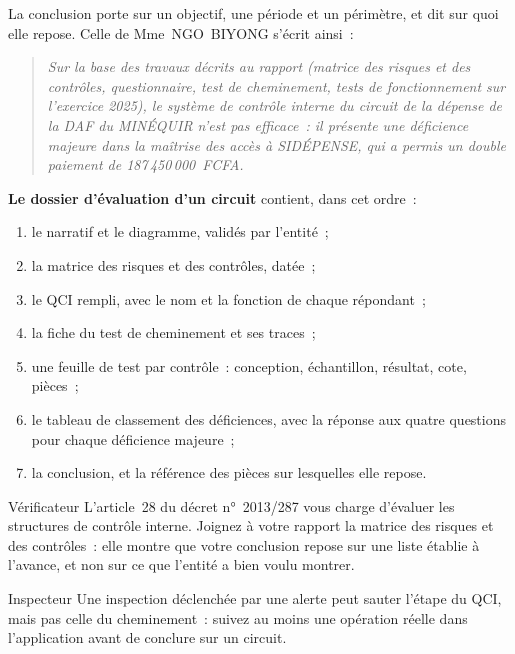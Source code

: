 La conclusion porte sur un objectif, une période et un périmètre, et dit
sur quoi elle repose. Celle de Mme~NGO~BIYONG s'écrit ainsi~:

\begin{quote}\itshape
Sur la base des travaux décrits au rapport (matrice des risques et des
contrôles, questionnaire, test de cheminement, tests de fonctionnement
sur l'exercice 2025), le système de contrôle interne du circuit de la
dépense de la DAF du MINÉQUIR n'est pas efficace~: il présente une
déficience majeure dans la maîtrise des accès à SIDÉPENSE, qui a permis
un double paiement de 187\,450\,000~FCFA.
\end{quote}

\begin{boxprocedure}
\textbf{Le dossier d'évaluation d'un circuit} contient, dans cet ordre~:
\begin{enumerate}
    \item le narratif et le diagramme, validés par l'entité~;
    \item la matrice des risques et des contrôles, datée~;
    \item le QCI rempli, avec le nom et la fonction de chaque répondant~;
    \item la fiche du test de cheminement et ses traces~;
    \item une feuille de test par contrôle~: conception, échantillon,
          résultat, cote, pièces~;
    \item le tableau de classement des déficiences, avec la réponse aux
          quatre questions pour chaque déficience majeure~;
    \item la conclusion, et la référence des pièces sur lesquelles elle
          repose.
\end{enumerate}
\end{boxprocedure}

\begin{boxmetier}{Vérificateur}
L'article~28 du décret n°~2013/287 vous charge d'évaluer les structures
de contrôle interne. Joignez à votre rapport la matrice des risques et des
contrôles~: elle montre que votre conclusion repose sur une liste établie
à l'avance, et non sur ce que l'entité a bien voulu montrer.
\end{boxmetier}

\begin{boxmetier}{Inspecteur}
Une inspection déclenchée par une alerte peut sauter l'étape du QCI, mais
pas celle du cheminement~: suivez au moins une opération réelle dans
l'application avant de conclure sur un circuit.
\end{boxmetier}

